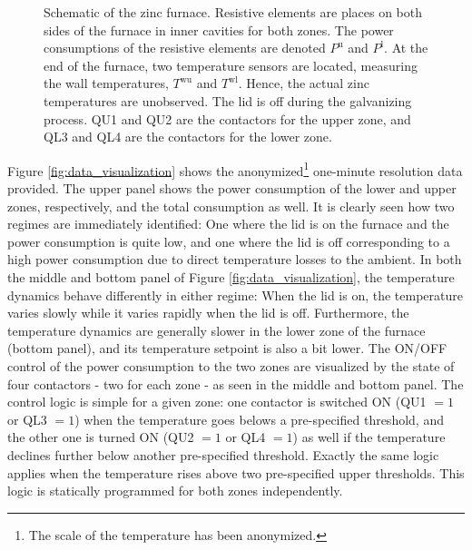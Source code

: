 \documentclass[sigconf]{acmart}
\begin{document}
\begin{figure}[t]
    \centering
    
    \caption{Schematic of the zinc furnace. Resistive elements are places on both sides of the furnace in inner cavities for both zones. The power consumptions of the resistive elements are denoted $P^{\text{u}}$ and $P^{\text{l}}$. At the end of the furnace, two temperature sensors are located, measuring the wall temperatures, $T^{\text{wu}}$ and $T^{\text{wl}}$. Hence, the actual zinc temperatures are unobserved. The lid is off during the galvanizing process. QU1 and QU2 are the contactors for the upper zone, and QL3 and QL4 are the contactors for the lower zone.}
    \label{fig:furnace_schematic_tikz}
\end{figure}

Figure \ref{fig:data_visualization} shows the anonymized\footnote{The scale of the temperature has been anonymized.} one-minute resolution data provided. The upper panel shows the power consumption of the lower and upper zones, respectively, and the total consumption as well. It is clearly seen how two regimes are immediately identified: One where the lid is on the furnace and the power consumption is quite low, and one where the lid is off corresponding to a high power consumption due to direct temperature losses to the ambient. In both the middle and bottom panel of Figure \ref{fig:data_visualization}, the temperature dynamics behave differently in either regime: When the lid is on, the temperature varies slowly while it varies rapidly when the lid is off. Furthermore, the temperature dynamics are generally slower in the lower zone of the furnace (bottom panel), and its temperature setpoint is also a bit lower. The ON/OFF control of the power consumption to the two zones are visualized by the state of four contactors - two for each zone - as seen in the middle and bottom panel. The control logic is simple for a given zone: one contactor is switched ON (QU1 $=1$ or QL3 $=1$) when the temperature goes belows a pre-specified threshold, and the other one is turned ON (QU2 $=1$ or QL4 $=1$) as well if the temperature declines further below another pre-specified threshold. Exactly the same logic applies when the temperature rises above two pre-specified upper thresholds. This logic is statically programmed for both zones independently.
\end{document}
